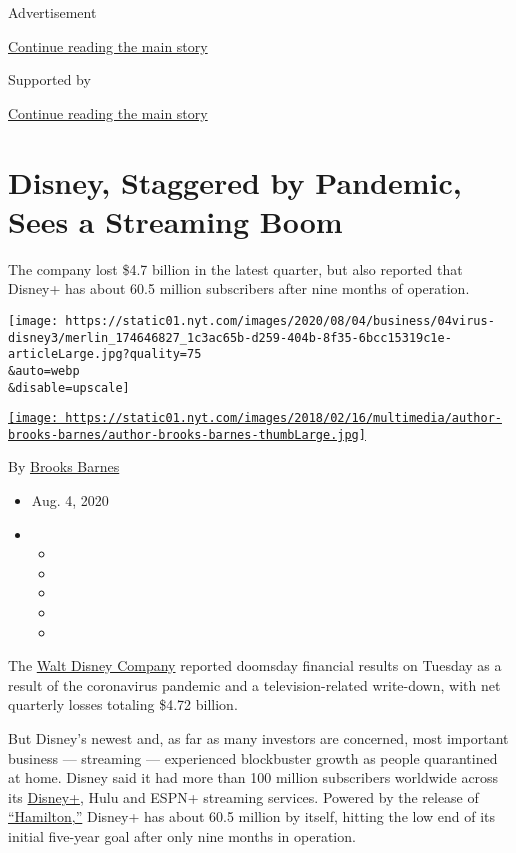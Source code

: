 Advertisement

\protect\hyperlink{after-top}{Continue reading the main story}

Supported by

\protect\hyperlink{after-sponsor}{Continue reading the main story}

\hypertarget{disney-staggered-by-pandemic-sees-a-streaming-boom}{%
\section{Disney, Staggered by Pandemic, Sees a Streaming
Boom}\label{disney-staggered-by-pandemic-sees-a-streaming-boom}}

The company lost \$4.7 billion in the latest quarter, but also reported
that Disney+ has about 60.5 million subscribers after nine months of
operation.

\texttt{[image: https://static01.nyt.com/images/2020/08/04/business/04virus-disney3/merlin\_174646827\_1c3ac65b-d259-404b-8f35-6bcc15319c1e-articleLarge.jpg?quality=75\\\&auto=webp\\\&disable=upscale]}

\href{https://www.nytimes.com/by/brooks-barnes}{\texttt{[image: https://static01.nyt.com/images/2018/02/16/multimedia/author-brooks-barnes/author-brooks-barnes-thumbLarge.jpg]}}

By \href{https://www.nytimes.com/by/brooks-barnes}{Brooks Barnes}

\begin{itemize}
\item
  Aug. 4, 2020
\item
  \begin{itemize}
  \item
  \item
  \item
  \item
  \item
  \end{itemize}
\end{itemize}

The
\href{https://www.nytimes.com/2020/05/04/business/media/coronavirus-disney.html?searchResultPosition=3}{Walt
Disney Company} reported doomsday financial results on Tuesday as a
result of the coronavirus pandemic and a television-related write-down,
with net quarterly losses totaling \$4.72 billion.

But Disney's newest and, as far as many investors are concerned, most
important business --- streaming --- experienced blockbuster growth as
people quarantined at home. Disney said it had more than 100 million
subscribers worldwide across its
\href{https://www.nytimes.com/2020/04/08/business/disney-plus-50-million-subscribers.html}{Disney+},
Hulu and ESPN+ streaming services. Powered by the release of
\href{https://www.nytimes.com/2020/06/30/movies/hamilton-review-disney-plus.html?searchResultPosition=4}{``Hamilton,''}
Disney+ has about 60.5 million by itself, hitting the low end of its
initial five-year goal after only nine months in operation.

